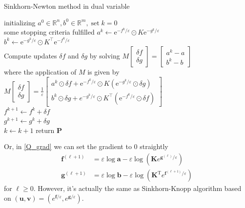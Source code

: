 \documentclass{article}
\begin{document}
\begin{large}
\begin{algorithm}[H]
  \SetAlgoNoLine
  \caption{Sinkhorn-Newton method in dual variable} 
  initializing $a ^ { 0 } \in \mathbb { R } ^ { n } , b ^ { 0 } \in \mathbb { R } ^ { m } , \operatorname { set } k = 0$\\
  \Repeat
  { some stopping criteria fulfilled }{
 $a ^ { k }\gets  \mathrm { e } ^ { - f ^ { k } / \varepsilon } \odot K \mathrm { e } ^ { - g ^ { k } / \varepsilon }$\\
 $b ^ { k } \gets  \mathrm { e } ^ { - g ^ { k } / \varepsilon } \odot K ^ { \top } \mathrm { e } ^ { - f ^ { k } / \varepsilon }$\\
 Compute updates $\delta f$ and $\delta g$ by solving
$M \left[ \begin{array} { c } { \delta f } \\ { \delta g } \end{array} \right] = \left[ \begin{array} { c } { a ^ { k } - a } \\ { b ^ { k } - b } \end{array} \right]$\\
   where the application of $M$ is given by
$M \left[ \begin{array} { c } { \delta f } \\ { \delta g } \end{array} \right] = \frac { 1 } { \varepsilon } \left[ \begin{array} { c } { a ^ { k } \odot \delta f + \mathrm { e } ^ { - f ^ { k } / \varepsilon } \odot K \left( \mathrm { e } ^ { - g ^ { k } / \varepsilon } \odot \delta g \right) } \\ { b ^ { k } \odot \delta g + e ^ { - g ^ { k } / \varepsilon } \odot K ^ { \top } \left( \mathrm { e } ^ { - f ^ { k } / \varepsilon } \odot \delta f \right) } \end{array} \right]$\\
$f ^ { k + 1 } \gets f ^ { k } + \delta f$\\
$g ^ { k + 1 } \gets  g ^ { k } + \delta g$\\
$k\gets k+1$
  }
  return $\mathbf{P}$
\end{algorithm}

Or, in \ref{Q_grad} we can set the gradient to 0 straightly
\begin{align}
\mathbf { f } ^ { ( \ell + 1 ) } &= \varepsilon \log \mathbf { a } - \varepsilon \log \left( \mathbf { K } e ^ { \mathbf { g } ^ { ( \ell ) } / \varepsilon } \right)\label{f_update}\\
\mathbf { g } ^ { ( \ell + 1 ) } &= \varepsilon \log \mathbf { b } - \varepsilon \log \left( \mathbf { K } ^ { \mathrm { T } } e ^ { \mathbf { f } ^ { ( \ell + 1 ) } / \varepsilon } \right)
\label{g_update}
\end{align}
for $\ell \ge0$. However, it's actually the same as Sinkhorn-Knopp algorithm based on $( \mathbf { u } , \mathbf { v } ) = \left( e ^ { \mathbf { f } / \varepsilon } , e ^ { \mathbf { g } / \varepsilon } \right)$.


\end{large}
\end{document}
